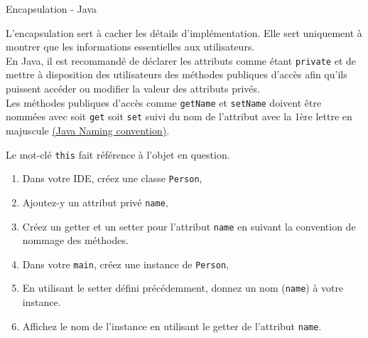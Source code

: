\begin{Exercice}[10 minutes]{Encapsulation - Java}

L'encapsulation sert à cacher les détails d'implémentation. Elle sert uniquement à montrer que les informations essentielles aux utilisateurs.\\

En Java, il est recommandé de déclarer les attributs comme étant \lstinline{private} et de mettre à disposition des utilisateurs des méthodes publiques d'accès afin qu'ils puissent accéder ou modifier la valeur des attributs privés.\\

Les méthodes publiques d'accès comme \lstinline{getName} et \lstinline{setName} doivent être nommées avec soit \lstinline{get} soit \lstinline{set} suivi du nom de l'attribut avec la 1ère lettre en majuscule \href{https://www.oracle.com/java/technologies/javase/codeconventions-namingconventions.html}{(Java Naming convention)}. 

Le mot-clé \lstinline{this} fait référence à l'objet en question.\\

\begin{enumerate}
	\item Dans votre IDE, créez une classe \lstinline{Person},
	\item Ajoutez-y un attribut privé \lstinline{name},
	\item Créez un getter et un setter pour l'attribut \lstinline{name} en suivant la convention de nommage des méthodes.
	\item Dans votre \lstinline{main}, créez une instance de \lstinline{Person}, 
	\item En utilisant le setter défini précédemment, donnez un nom (\lstinline{name}) à votre instance.
	\item Affichez le nom de l'instance en utilisant le getter de l'attribut \lstinline{name}.
\end{enumerate}
	\begin{solution}  
		 
	\end{solution}
\end{Exercice}
	
